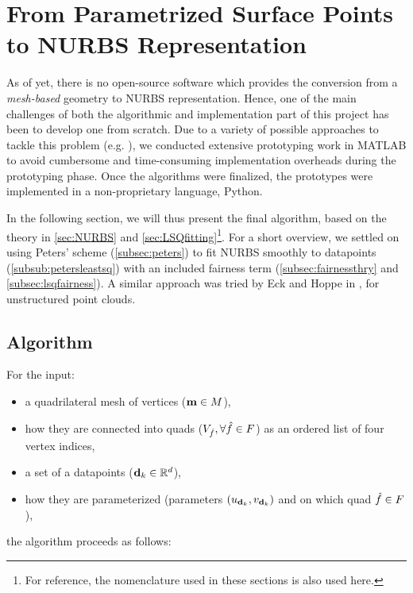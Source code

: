 \section{From Parametrized Surface Points to NURBS Representation}
As of yet, there is no open-source software which provides the conversion from a \textit{mesh-based} geometry to NURBS representation. Hence, one of the main challenges of both the algorithmic and implementation part of this project has been to develop one from scratch. Due to a variety of possible approaches to tackle this problem (e.g. \cite{eck1996automatic, becker2011advanced}), we conducted extensive prototyping work in MATLAB \cite{MATLAB} to avoid cumbersome and time-consuming implementation overheads during the prototyping phase. Once the algorithms were finalized, the prototypes were implemented in a non-proprietary language, Python. 

In the following section, we will thus present the final algorithm, based on the theory in \autoref{sec:NURBS} and \autoref{sec:LSQfitting}\footnote{For reference, the nomenclature used in these sections is also used here.}. For a short overview, we settled on using Peters' scheme (\autoref{subsec:peters}) to fit NURBS smoothly to datapoints (\autoref{subsub:petersleastsq}) with an included fairness term (\autoref{subsec:fairnessthry} and \autoref{subsec:lsqfairness}). A similar approach was tried by Eck and Hoppe in \cite{eck1996automatic}, for unstructured point clouds.

\subsection{Algorithm}
For the input:
\begin{itemize}
\item a quadrilateral mesh of vertices ($\petersControlMeshVec \in \petersControlMesh$),
\item how they are connected into quads ($\verticesof{\hat{f}}, \forall \hat{f} \in \petersFaces$) as an ordered list of four vertex indices,
\item a set of a datapoints ($\lsDataPoint_k \in \mathbb{R}^d$),
\item how they are parameterized (parameters $(u_{\lsDataPoint_k}, v_{\lsDataPoint_k})$ and on which quad $\hat{f}\in\petersFaces$),
\end{itemize}
the algorithm proceeds as follows:

